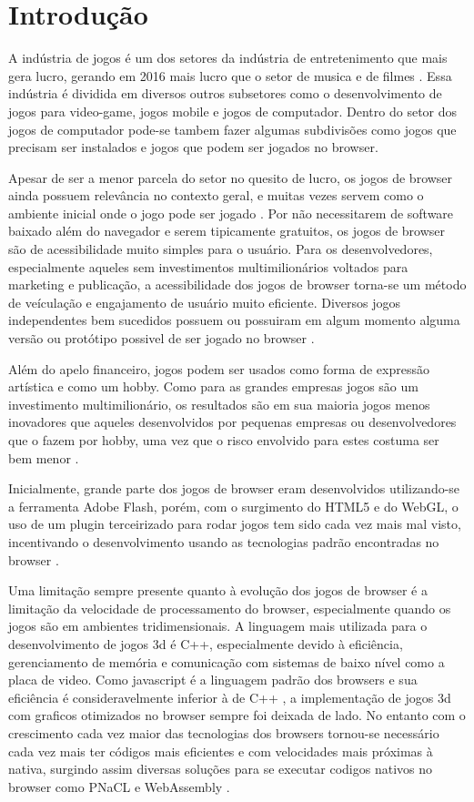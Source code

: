 \chapter{Introdução}

A indústria de jogos é um dos setores da indústria de entretenimento que mais gera lucro, gerando em 2016 mais lucro que o setor de musica e de filmes \cite{NASDAQ}. Essa indústria é dividida em diversos outros subsetores como o desenvolvimento de jogos para video-game, jogos mobile e jogos de computador. Dentro do setor dos jogos de computador pode-se tambem fazer algumas subdivisões como jogos que precisam ser instalados e jogos que podem ser jogados no browser.

Apesar de ser a menor parcela do setor no quesito de lucro, os jogos de browser ainda possuem relevância no contexto geral, e muitas vezes servem como o ambiente inicial onde o jogo pode ser jogado \cite{NEWZOO}. Por não necessitarem de software baixado além do navegador e serem tipicamente gratuitos, os jogos de browser são de acessibilidade muito simples para o usuário. Para os desenvolvedores, especialmente aqueles sem investimentos multimilionários voltados para marketing e publicação, a acessibilidade dos jogos de browser torna-se um método de veículação e engajamento de usuário muito eficiente. Diversos jogos independentes bem sucedidos possuem ou possuiram em algum momento alguma versão ou protótipo possivel de ser jogado no browser \cite{BOI, CLICKERHEROES, SUPERHOT}.

Além do apelo financeiro, jogos podem ser usados como forma de expressão artística e como um hobby. Como para as grandes empresas jogos são um investimento multimilionário, os resultados são em sua maioria jogos menos inovadores que aqueles desenvolvidos por pequenas empresas ou desenvolvedores que o fazem por hobby, uma vez que o risco envolvido para estes costuma ser bem menor \cite{CREATINGGAMES}.

Inicialmente, grande parte dos jogos de browser eram desenvolvidos utilizando-se a ferramenta Adobe Flash, porém, com o surgimento do HTML5 e do WebGL, o uso de um plugin terceirizado para rodar jogos tem sido cada vez mais mal visto, incentivando o desenvolvimento usando as tecnologias padrão encontradas no browser \cite{UNITYWEB, FLASH}.

Uma limitação sempre presente quanto à evolução dos jogos de browser é a limitação da velocidade de processamento do browser, especialmente quando os jogos são em ambientes tridimensionais. A linguagem mais utilizada para o desenvolvimento de jogos 3d é C++, especialmente devido à eficiência, gerenciamento de memória e comunicação com sistemas de baixo nível como a placa de video. Como javascript é a linguagem padrão dos browsers e sua eficiência é consideravelmente inferior à de C++ \cite{BENCHMARK}, a implementação de jogos 3d com graficos otimizados no browser sempre foi deixada de lado. No entanto com o crescimento cada vez maior das tecnologias dos browsers tornou-se necessário cada vez mais ter códigos mais eficientes e com velocidades mais próximas à nativa, surgindo assim diversas soluções para se executar codigos nativos no browser como PNaCL \cite{PNACL} e WebAssembly \cite{WASM}.

